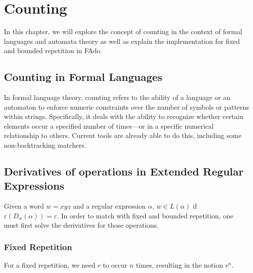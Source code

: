 \chapter{Counting}\label{chap:counting}
In this chapter, we will explore the concept of counting in the context of formal languages and automata theory as well as explain the implementation for fixed and bounded repetition in FAdo.

\section{Counting in Formal Languages}
In formal language theory, counting refers to the ability of a language or an automaton to enforce numeric constraints over the number of symbols or patterns within strings. Specifically, it deals with the ability to recognize whether certain elements occur a specified number of times—or in a specific numerical relationship to others.
Current tools are already able to do this, including some non-backtracking matchers.

\section{Derivatives of operations in Extended Regular Expressions}
Given a word $w = xyz$ and a regular expression $\alpha$, $w \in L(\alpha)$ if $\varepsilon(D_w(\alpha)) = \varepsilon$.
In order to match with fixed and bounded repetition, one must first solve the derivatives for those operations.


\break

\subsection{Fixed Repetition}
For a fixed repetition, we need $r$ to occur $n$ times, resulting in the notion $r^n$.


